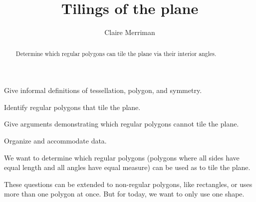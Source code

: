 \documentclass[noauthor,nooutcomes,handout,12pt]{ximera}
\title{Tilings of the plane}
\author{Claire Merriman}
\begin{document}
\begin{abstract}
Determine which regular polygons can tile the plane via their interior
angles.
\end{abstract}
\maketitle

\begin{listOutcomes}
\item Give informal definitions of tessellation, polygon, and
  symmetry.
\item Identify regular polygons that tile the plane.
\item Give arguments demonstrating which regular polygons cannot tile
  the plane.
\item Organize and accommodate data.
\end{listOutcomes}


We want to determine which regular polygons (polygons where all sides
have equal length and all angles have equal measure) can be used as to
tile the plane.
 
These questions can be extended to non-regular polygons, like
rectangles, or uses more than one polygon at once. But for today, we
want to only use one shape.

\mynewpage
\end{document}
